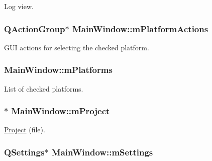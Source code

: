 Log view. 

\hypertarget{class_main_window_ac66bc9bf2832c507bb49e07c7b8a2dd1}{
\subsubsection[{m\-Platform\-Actions}]{\setlength{\rightskip}{0pt plus 5cm}Q\-Action\-Group$\ast$ Main\-Window\-::m\-Platform\-Actions\hspace{0.3cm}{\ttfamily [protected]}}}\label{class_main_window_ac66bc9bf2832c507bb49e07c7b8a2dd1}


G\-U\-I actions for selecting the checked platform. 

\hypertarget{class_main_window_a8bd97f168e4c804cfe770af7ddf3faf1}{
\subsubsection[{m\-Platforms}]{ Main\-Window\-::m\-Platforms}}\label{class_main_window_a8bd97f168e4c804cfe770af7ddf3faf1}
List of checked platforms. \hypertarget{class_main_window_a556c03edd946d60bc426f184d2604678}{
\subsubsection[{m\-Project}]{$\ast$ Main\-Window\-::m\-Project\hspace{0.3cm}{\ttfamily [protected]}}}\label{class_main_window_a556c03edd946d60bc426f184d2604678}


\hyperlink{class_project}{Project} (file). 

\hypertarget{class_main_window_ac842753fda612bfd6f9b60b07f71acc2}{
\subsubsection[{m\-Settings}]{\setlength{\rightskip}{0pt plus 5cm}Q\-Settings$\ast$ Main\-Window\-::m\-Settings\hspace{0.3cm}{\ttfamily [protected]}}}\label{class_main_window_ac842753fda612bfd6f9b60b07f71acc2}



